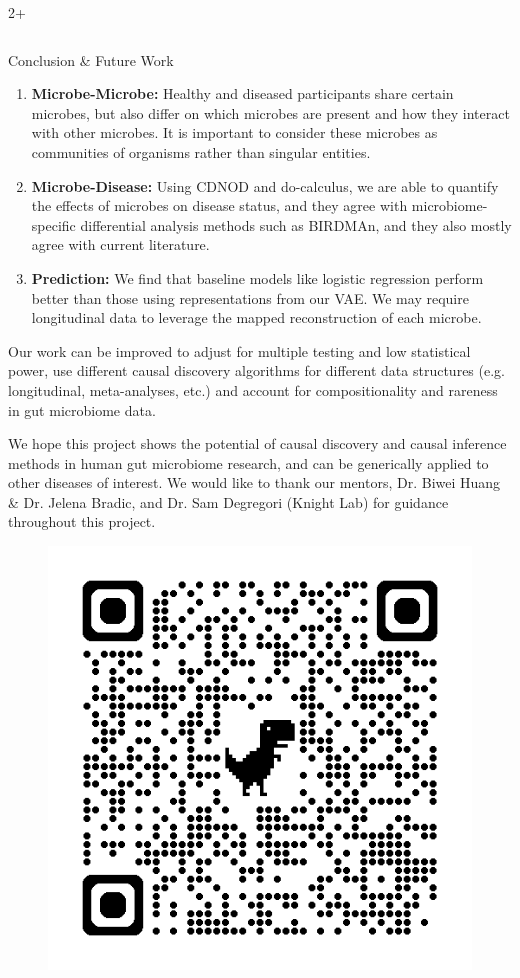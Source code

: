 \documentclass[final]{beamer}
\newlength{\sepwidth}
\newlength{\colwidth}
\begin{document}
\begin{frame}[t]
\begin{columns}[t]
\begin{column}{2\colwidth + \sepwidth}
\begin{columns}[t]
    \begin{column}{\colwidth}
      
      \begin{block}{Conclusion \& Future Work}
    
        \begin{enumerate}
            \item \textbf{Microbe-Microbe:} Healthy and diseased participants share certain microbes, but also differ on which microbes are present and how they interact with other microbes. It is important to consider these microbes as communities of organisms rather than singular entities.      
            \item \textbf{Microbe-Disease:} Using CDNOD and do-calculus, we are able to quantify the effects of microbes on disease status, and they agree with microbiome-specific differential analysis methods such as BIRDMAn, and they also mostly agree with current literature.
            \item \textbf{Prediction:} We find that baseline models like logistic regression perform better than those using representations from our VAE. We may require longitudinal data to leverage the mapped reconstruction of each microbe.
        \end{enumerate}
        
        Our work can be improved to adjust for multiple testing and low statistical power, use different causal discovery algorithms for different data structures (e.g. longitudinal, meta-analyses, etc.) and account for compositionality and rareness in gut microbiome data. 
        
        We hope this project shows the potential of causal discovery and causal inference methods in human gut microbiome research, and can be generically applied to other diseases of interest. We would like to thank our mentors, Dr. Biwei Huang \& Dr. Jelena Bradic,  and Dr. Sam Degregori (Knight Lab) for guidance throughout this project.
        
        \begin{figure}
                \centering
                \includegraphics[width=0.2\linewidth]{website_qr.png}
        \end{figure} 
        

\end{block}
\end{column}
\end{columns}
\end{column}
\end{columns}
\end{frame}
\end{document}
